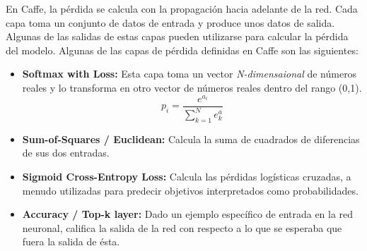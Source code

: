 \documentclass[a4paper, 12pt, spanish, chapterprefix, numbers=noenddot]{book}
\begin{document}
En Caffe, la pérdida se calcula con la propagación hacia adelante de la red. Cada capa toma un conjunto de datos de entrada y produce unos datos de salida. Algunas de las salidas de estas capas pueden utilizarse para calcular la pérdida del modelo. Algunas de las capas de pérdida definidas en Caffe son las siguientes:

\begin{itemize}
\begin{comment}
\item \textbf{Multinomial Logistic Loss}
\item \textbf{Infogain Loss}
\end{comment}
\item \textbf{Softmax with Loss:} Esta capa toma un vector \textit{N-dimensaional} de números reales y lo transforma en otro vector de números reales dentro del rango (0,1).
\begin{equation}
p_{i}=\frac{e^{a_{i}}}{\sum_{k=1}^{N}e^{a}_{k}}
\end{equation}
\item \textbf{Sum-of-Squares / Euclidean:} Calcula la suma de cuadrados de diferencias de sus dos entradas.
\begin{comment}
\item \textbf{Hinge / Margin}
\end{comment}
\item \textbf{Sigmoid Cross-Entropy Loss:} Calcula las pérdidas logísticas cruzadas, a menudo utilizadas para predecir objetivos interpretados como probabilidades.
\item \textbf{Accuracy / Top-k layer:} Dado un ejemplo específico de entrada en la red neuronal, califica la salida de la red con respecto a lo que se esperaba que fuera la salida de ésta. 
\begin{comment}
\item \textbf{Contrastive Loss}
\end{comment}
\end{itemize}

\begin{comment}
\subsubsection{Capas de normalización}

\begin{itemize}
\item \textbf{Local Response Normalization (LRN):} Normaliza regiones locales de los datos de entrada.
\item \textbf{Mean Variance Normalization (MVN):} Realiza una normalización de contraste / normalización de instancia.
\item \textbf{Batch Normalization:} Realiza normalizaciones sobre pequeños lotes de datos de entrada.
\end{itemize}
\end{comment}
\end{document}
